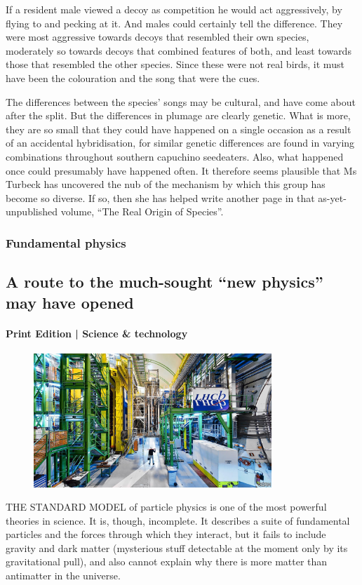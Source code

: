 \documentclass{article}
\begin{document}
If a resident male viewed a decoy as competition he would act aggressively, by flying to and pecking at it. And males could certainly tell the difference. They were most aggressive towards decoys that resembled their own species, moderately so towards decoys that combined features of both, and least towards those that resembled the other species. Since these were not real birds, it must have been the colouration and the song that were the cues. 

The differences between the species' songs may be cultural, and have come about after the split. But the differences in plumage are clearly genetic. What is more, they are so small that they could have happened on a single occasion as a result of an accidental hybridisation, for similar genetic differences are found in varying combinations throughout southern capuchino seedeaters. Also, what happened once could presumably have happened often. It therefore seems plausible that Ms Turbeck has uncovered the nub of the mechanism by which this group has become so diverse. If so, then she has helped write another page in that as-yet-unpublished volume, ``The Real Origin of Species''. {} 
\clearpage
\subsubsection{Fundamental physics }
\subsection{A route to the much-sought ``new physics'' may have opened }
\paragraph{Print Edition | Science \& technology  \quad \color{gray}{Mar 25th 2021 }}
\begin{figure}[h]
\centering
\includegraphics[width=0.8\textwidth]{images/20210327_stp002.jpg}
\end{figure}
\lettrine{T}HE STANDARD MODEL of particle physics is one of the most powerful theories in science. It is, though, incomplete. It describes a suite of fundamental particles and the forces through which they interact, but it fails to include gravity and dark matter (mysterious stuff detectable at the moment only by its gravitational pull), and also cannot explain why there is more matter than antimatter in the universe. 
\end{document}
